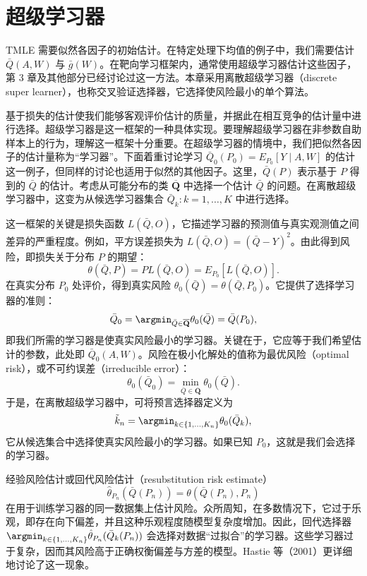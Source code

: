 \section{超级学习器}

TMLE 需要似然各因子的初始估计。在特定处理下均值的例子中，我们需要估计 $\bar Q(A,W)$ 与 $\bar g(W)$。在靶向学习框架内，通常使用超级学习器估计这些因子，第 3 章及其他部分已经讨论过这一方法。本章采用离散超级学习器（discrete super learner），也称交叉验证选择器，它选择使风险最小的单个算法。

基于损失的估计使我们能够客观评价估计的质量，并据此在相互竞争的估计量中进行选择。超级学习器是这一框架的一种具体实现。要理解超级学习器在非参数自助样本上的行为，理解这一框架十分重要。在超级学习器的情境中，我们把似然各因子的估计量称为“学习器”。下面着重讨论学习 $\bar Q_0(P_0)=E_{P_0}[Y\mid A,W]$ 的估计这一例子，但同样的讨论也适用于似然的其他因子。这里，$\bar Q(P)$ 表示基于 $P$ 得到的 $\bar Q$ 的估计。考虑从可能分布的类 $\overline{\mathbf Q}$ 中选择一个估计 $\bar Q$ 的问题。在离散超级学习器中，这变为从候选学习器集合
$\bar Q_k:k=1,\ldots,K$ 中进行选择。

这一框架的关键是损失函数 $L(\bar Q,O)$，它描述学习器的预测值与真实观测值之间差异的严重程度。例如，平方误差损失为
$L(\bar Q,O)=(\bar Q-Y)^2$。由此得到风险，即损失关于分布 $P$ 的期望：
\[
 \theta(\bar Q,P)=PL(\bar Q,O)=E_{P_0}[L(\bar Q,O)].
\]
在真实分布 $P_0$ 处评价，得到真实风险
$\theta_0(\bar Q)=\theta(\bar Q,P_0)$。它提供了选择学习器的准则：
\[
 \bar Q_0=\argmin_{\bar Q\in\overline{\mathbf Q}}
 \theta_0(\bar Q)=\bar Q(P_0),
\]
即我们所需的学习器是使真实风险最小的学习器。关键在于，它应等于我们希望估计的参数，此处即 $\bar Q_0(A,W)$。风险在极小化解处的值称为最优风险（optimal risk），或不可约误差（irreducible error）：
\[
 \theta_0(\bar Q_0)=\min_{\bar Q\in\overline{\mathbf Q}}\theta_0(\bar Q).
\]
于是，在离散超级学习器中，可将预言选择器定义为
\[
 \tilde k_n=\argmin_{k\in\{1,\ldots,K_n\}}\theta_0(\bar Q_k),
\]
它从候选集合中选择使真实风险最小的学习器。如果已知 $P_0$，这就是我们会选择的学习器。

经验风险估计或回代风险估计（resubstitution risk estimate）
\[
 \hat\theta_{P_n}(\bar Q(P_n))=\theta(\bar Q(P_n),P_n)
\]
在用于训练学习器的同一数据集上估计风险。众所周知，在多数情况下，它过于乐观，即存在向下偏差，并且这种乐观程度随模型复杂度增加。因此，回代选择器
$\argmin_{k\in\{1,\ldots,K_n\}}\hat\theta_{P_n}(\bar Q_k(P_n))$
会选择对数据“过拟合”的学习器。这些学习器过于复杂，因而其风险高于正确权衡偏差与方差的模型。Hastie 等（2001）更详细地讨论了这一现象。

